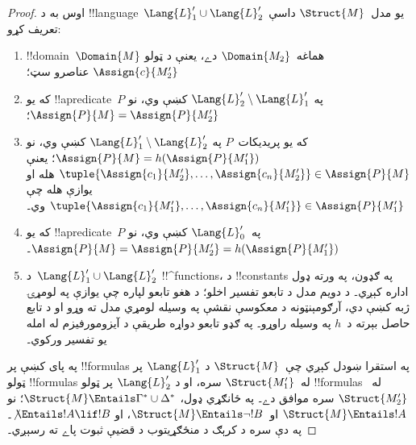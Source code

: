 \documentclass[../../../include/open-logic-section]{subfiles}
\begin{document}
\begin{proof}
اوس به د !!{language}~$\Lang{L}'_1 \cup \Lang{L}'_2$ يو
مدل~$\Struct{M}$ داسې تعريف کړو:
\begin{enumerate}
\item !!{domain}~$\Domain{M}$ هماغه~$\Domain{M_2}$ دے، يعنې د ټولو
  $\Assign{c}{M'_2}$ عناصرو سټ؛
\item که يو !!a{predicate}~$P$ په
  $\Lang{L}'_2 \setminus \Lang{L}'_1$ کښې وي، نو
  $\Assign{P}{M} = \Assign{P}{M'_2}$؛
\item که يو پريديکات~$P$ په
  $\Lang{L}'_1\setminus \Lang{L}'_2$ کښې وي، نو
  $\Assign{P}{M} = h(\Assign{P}{M'_1})$؛ يعنې
  $\tuple{\Assign{c_1}{M'_2}, \dots, \Assign{c_n}{M'_2}} \in
  \Assign{P}{M}$ هله او يوازې هله چې
  $\tuple{\Assign{c_1}{M'_1}, \dots,
  \Assign{c_n}{M'_1}} \in \Assign{P}{M'_1}$ وي۔
\item که يو !!a{predicate}~$P$ په~$\Lang{L}'_0$ کښې وي، نو
  $\Assign{P}{M} = \Assign{P}{M'_2} = h(\Assign{P}{M'_1})$۔
\item د~$\Lang{L}'_1 \cup \Lang{L}'_2$ !!^{function}s، د
  !!{constant}s په ګډون، په ورته ډول اداره کېږي۔ د دويم مدل د تابعو تفسير اخلو؛ د هغو تابعو لپاره چې يوازې په لومړۍ ژبه کښې دي، آرګومېنټونه د معکوسې نقشې په وسيله لومړي مدل ته وړو او د تابع حاصل بېرته د~$h$ په وسيله راوړو۔ په ګډو تابعو دواړه طريقې د آيزومورفيزم له امله يو تفسير ورکوي۔
\end{enumerate}

په پای کښې پر !!{formula}s په استقرا ښودل کېږي چې~$\Struct{M}$ د
$\Lang{L}'_1$ پر ټولو !!{formula}s له~$\Struct{M'_1}$ سره، او د
$\Lang{L}'_2$ پر ټولو !!{formula}s له~$\Struct{M'_2}$ سره موافق دے۔
په ځانګړي ډول، $\Struct{M} \Entails \Gamma^* \cup \Delta^*$؛ نو
$\Struct{M} \Entails !A$ او~$\Struct{M} \Entails \lnot!B$، او
$\not\Entails !A \lif !B$۔ په دې سره د کرېګ د منځګړيتوب د قضيې
ثبوت پاے ته رسېږي۔
\end{proof}
\end{document}
